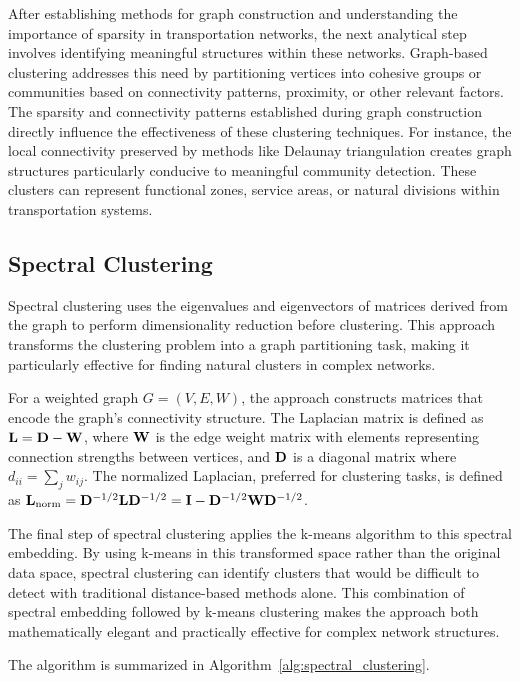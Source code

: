 After establishing methods for graph construction and understanding the importance of sparsity in transportation networks, the next analytical step involves identifying meaningful structures within these networks. Graph-based clustering addresses this need by partitioning vertices into cohesive groups or communities based on connectivity patterns, proximity, or other relevant factors. The sparsity and connectivity patterns established during graph construction directly influence the effectiveness of these clustering techniques. For instance, the local connectivity preserved by methods like Delaunay triangulation creates graph structures particularly conducive to meaningful community detection. These clusters can represent functional zones, service areas, or natural divisions within transportation systems.

\subsection{Spectral Clustering}
\label{subsec:SpectralClustering}

Spectral clustering uses the eigenvalues and eigenvectors of matrices derived from the graph to perform dimensionality reduction before clustering. This approach transforms the clustering problem into a graph partitioning task, making it particularly effective for finding natural clusters in complex networks.

For a weighted graph $G=(V,E,W)$, the approach constructs matrices that encode the graph's connectivity structure. The Laplacian matrix is defined as $\mathbf{L} = \mathbf{D} - \mathbf{W}$, where $\mathbf{W}$ is the edge weight matrix with elements representing connection strengths between vertices, and $\mathbf{D}$ is a diagonal matrix where $d_{ii} = \sum_{j} w_{ij}$. The normalized Laplacian, preferred for clustering tasks, is defined as $\mathbf{L}_{\text{norm}} = \mathbf{D}^{-1/2} \mathbf{L} \mathbf{D}^{-1/2} = \mathbf{I} - \mathbf{D}^{-1/2} \mathbf{W} \mathbf{D}^{-1/2}$.

The final step of spectral clustering applies the k-means algorithm to this spectral embedding. By using k-means in this transformed space rather than the original data space, spectral clustering can identify clusters that would be difficult to detect with traditional distance-based methods alone. This combination of spectral embedding followed by k-means clustering makes the approach both mathematically elegant and practically effective for complex network structures.

The algorithm is summarized in Algorithm~\ref{alg:spectral_clustering}.

